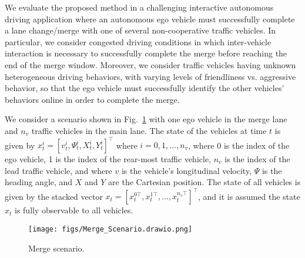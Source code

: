 \documentclass[letterpaper, 10 pt, conference]{IEEEconf}
\begin{document}
We evaluate the proposed method in a challenging interactive autonomous driving application where an autonomous ego vehicle must successfully complete a lane change/merge with one of several non-cooperative traffic vehicles.
In particular, we consider congested driving conditions in which inter-vehicle interaction is necessary to successfully complete the merge before reaching the end of the merge window. 
Moreover, we consider traffic vehicles having unknown heterogeneous driving behaviors, with varying levels of friendliness vs. aggressive behavior, so that the ego vehicle must successfully identify the other vehicles' behaviors online in order to complete the merge. 

We consider a scenario shown in Fig.~\ref{fig:merge_scenario} with one ego vehicle in the merge lane and $n_v$ traffic vehicles in the main lane.
The state of the vehicles at time $t$ is given by
$x_{t}^{i} = [v_{t}^{i}, \Psi_{t}^{i}, X_{t}^{i}, Y_{t}^{i}]^{\top}$
where $i = 0, 1, \dots, n_v$,
where 0 is the index of the ego vehicle,
1 is the index of the rear-most traffic vehicle,
$n_v$ is the index of the lead traffic vehicle,
and where $v$ is the vehicle's longitudinal velocity,
$\Psi$ is the heading angle,
and $X$ and $Y$ are the Cartesian position.
% 
The state of all vehicles is given by the stacked vector 
$x_{t} = [x_{t}^{0 \top}, x_{t}^{1 \top}, \dots, x_{t}^{n_v \top} ]^{\top}$,
and it is assumed the state $x_{t}$ is fully observable to all vehicles.
\begin{figure}[ht]
    \centering
    \texttt{[image: figs/Merge\_Scenario.drawio.png]}
    \caption{Merge scenario.}
    \label{fig:merge_scenario}
\end{figure}
\end{document}
